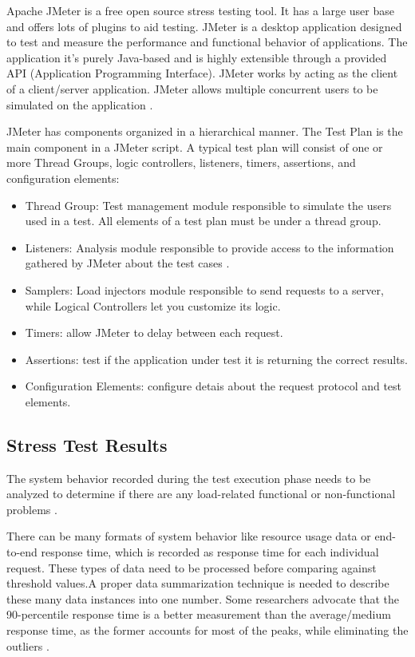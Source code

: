 \documentclass[times]{stvrauth}
\begin{document}
Apache JMeter is a free open source stress testing tool.  It has a large user base and offers lots of plugins to aid testing. JMeter is a desktop application designed to test and measure the performance and functional behavior of applications. The application it's purely Java-based and is highly extensible through a provided API (Application Programming Interface). JMeter works by acting as the client of a client/server application. JMeter allows multiple concurrent users to be simulated on the application \cite{Halili2008} \cite{Erinle2013}. 

JMeter has components organized  in a hierarchical manner. The Test Plan is the main component in a JMeter script. A typical test plan will consist of one or more Thread Groups, logic controllers, listeners, timers, assertions, and configuration elements:

\begin{itemize}
\item Thread Group: Test management module responsible to simulate the users used in a test. All elements of a test plan must be under a thread group.
\item Listeners: Analysis module responsible to provide access to the information gathered by JMeter about the test cases .
\item Samplers: Load injectors module responsible to send requests to a server, while Logical Controllers let you customize its logic.
\item Timers: allow JMeter to delay between each request.
\item Assertions: test if the application under test it is returning the correct results.
\item Configuration Elements: configure detais about the request protocol and test elements.
\end{itemize}


\subsection{Stress Test Results}

The system behavior recorded during the test execution phase needs to be analyzed to determine if there are any load-related functional or non-functional problems \cite{Jiang2010}.

There can be many formats of system behavior like resource usage data or end-to-end response time, which is recorded as response time for each individual request. These types of data need to be processed before comparing against threshold values.A proper data summarization technique is needed to describe these many data instances into one number. Some researchers advocate that the 90-percentile response time is a better measurement than the average/medium response time, as the former accounts for most of the peaks, while eliminating the outliers \cite{Jiang2010}.
\end{document}
